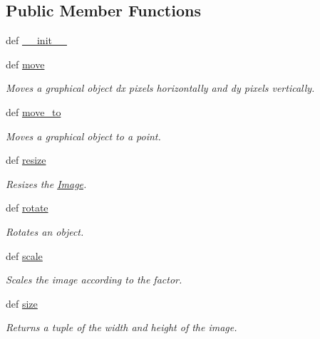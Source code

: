 \subsection*{Public Member Functions}
\begin{DoxyCompactItemize}
\item 
def \hyperlink{classbroken__cs110graphics_1_1Image_aa8de88ab79fc10411c764a11e8572a09}{\_\-\_\-init\_\-\_\-}
\item 
def \hyperlink{classbroken__cs110graphics_1_1Image_a3f251e1a4abf1d9bd47034ca1f2108da}{move}
\begin{DoxyCompactList}\small\item\em Moves a graphical object dx pixels horizontally and dy pixels vertically. \item\end{DoxyCompactList}\item 
def \hyperlink{classbroken__cs110graphics_1_1Image_a4070f6da8af60ef25ed9e0f8791cf920}{move\_\-to}
\begin{DoxyCompactList}\small\item\em Moves a graphical object to a point. \item\end{DoxyCompactList}\item 
def \hyperlink{classbroken__cs110graphics_1_1Image_a091c652307991279c974552524684894}{resize}
\begin{DoxyCompactList}\small\item\em Resizes the \hyperlink{classbroken__cs110graphics_1_1Image}{Image}. \item\end{DoxyCompactList}\item 
def \hyperlink{classbroken__cs110graphics_1_1Image_a9b5140ffcf53916d30e69a91c1e891ed}{rotate}
\begin{DoxyCompactList}\small\item\em Rotates an object. \item\end{DoxyCompactList}\item 
def \hyperlink{classbroken__cs110graphics_1_1Image_a7c200c523a71bb307a215b3551ec1d0f}{scale}
\begin{DoxyCompactList}\small\item\em Scales the image according to the factor. \item\end{DoxyCompactList}\item 
def \hyperlink{classbroken__cs110graphics_1_1Image_a16199f1f2ff5405b71a1ec0246534bca}{size}
\begin{DoxyCompactList}\small\item\em Returns a tuple of the width and height of the image. \item\end{DoxyCompactList}\end{DoxyCompactItemize}


